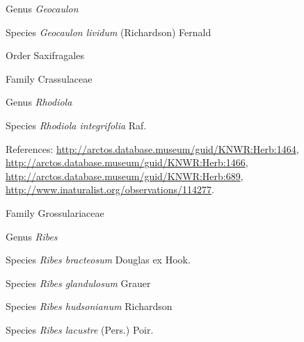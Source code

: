 \documentclass[9pt, article]{memoir}
\begin{document}
\begin{multicols}{2}
\vspace{6pt}\noindent\hspace{30pt}Genus \textit{Geocaulon}


\vspace{6pt}\noindent\hspace{36pt}Species \textit{Geocaulon lividum} (Richardson) Fernald


\vspace{6pt}\noindent\hspace{18pt}Order Saxifragales


\vspace{6pt}\noindent\hspace{24pt}Family Crassulaceae


\vspace{6pt}\noindent\hspace{30pt}Genus \textit{Rhodiola}


\vspace{6pt}\noindent\hspace{36pt}Species \textit{Rhodiola integrifolia} Raf.


\vspace{6pt}References: 
\url{http://arctos.database.museum/guid/KNWR:Herb:1464}, 
\url{http://arctos.database.museum/guid/KNWR:Herb:1466}, 
\url{http://arctos.database.museum/guid/KNWR:Herb:689}, 
\url{http://www.inaturalist.org/observations/114277}.

\vspace{6pt}\noindent\hspace{24pt}Family Grossulariaceae


\vspace{6pt}\noindent\hspace{30pt}Genus \textit{Ribes}


\vspace{6pt}\noindent\hspace{36pt}Species \textit{Ribes bracteosum} Douglas ex Hook.


\vspace{6pt}\noindent\hspace{36pt}Species \textit{Ribes glandulosum} Grauer


\vspace{6pt}\noindent\hspace{36pt}Species \textit{Ribes hudsonianum} Richardson


\vspace{6pt}\noindent\hspace{36pt}Species \textit{Ribes lacustre} (Pers.) Poir.



\end{multicols}
\end{document}
